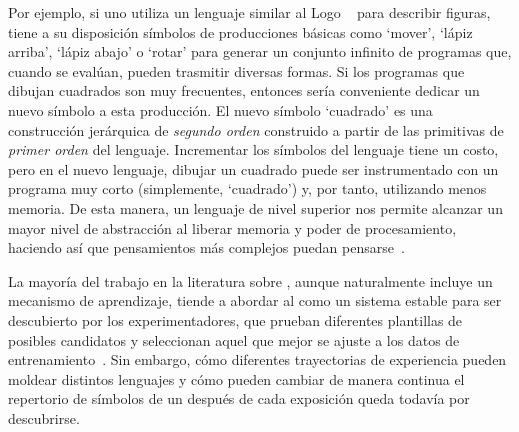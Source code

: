 Por ejemplo, si uno utiliza un lenguaje similar al Logo ~\cite{abelson1974logo} para describir figuras, tiene a su disposición símbolos de producciones básicas como `mover', `lápiz arriba', `lápiz abajo' o `rotar' para generar un conjunto infinito de programas que, cuando se evalúan, pueden trasmitir diversas formas. Si los programas que dibujan cuadrados son muy frecuentes, entonces sería conveniente dedicar un nuevo símbolo a esta producción. El nuevo símbolo `cuadrado' es una construcción jerárquica de {\em segundo orden} construido a partir de las primitivas de {\em primer orden} del lenguaje. Incrementar los símbolos del lenguaje tiene un costo, pero en el nuevo lenguaje, dibujar un cuadrado puede ser instrumentado con un programa muy corto (simplemente, `cuadrado') y, por tanto, utilizando menos memoria. De esta manera, un lenguaje de nivel superior nos permite alcanzar un mayor nivel de abstracción al liberar memoria y poder de procesamiento, haciendo así que pensamientos más complejos puedan pensarse~\cite{minsky1967computation,murphy1988comprehending}.


La mayoría del trabajo en la literatura sobre \lot, aunque naturalmente incluye un mecanismo de aprendizaje, tiende a abordar al \lot como un sistema estable para ser descubierto por los experimentadores, que prueban diferentes plantillas de posibles candidatos y seleccionan aquel que mejor se ajuste a los datos de entrenamiento~\cite{goodman2008rational,kemp2012exploring,piantadosi2016logical}. Sin embargo, cómo diferentes trayectorias de experiencia pueden moldear distintos lenguajes y cómo pueden cambiar de manera continua el repertorio de símbolos de un \lot después de cada exposición queda todavía por descubrirse.



